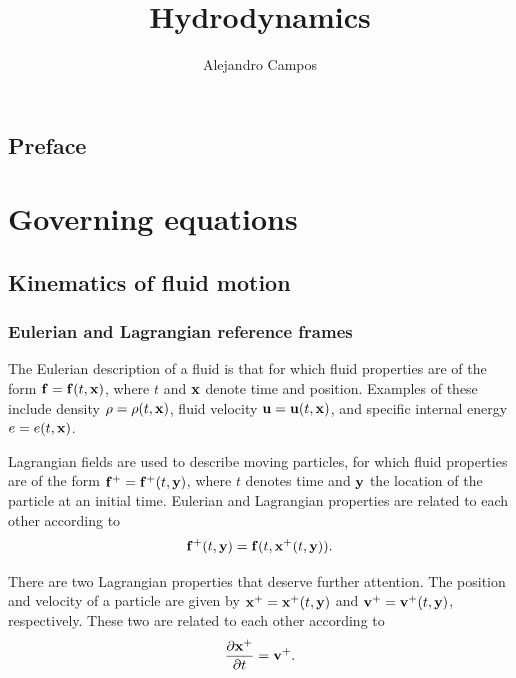 \documentclass[oneside,a4paper,11pt]{report}
\title{Hydrodynamics}
\author{Alejandro Campos}
\begin{document}
\maketitle
\tableofcontents

\chapter*{Preface}

\part{Governing equations}

\chapter{Kinematics of fluid motion}

\section{Eulerian and Lagrangian reference frames}
The Eulerian description of a fluid is that for which fluid properties are of the form $\mathbf{f} = \mathbf{f}(t,\mathbf{x})$, where $t$ and $\mathbf{x}$ denote time and position. Examples of these include density $\rho = \rho(t,\mathbf{x})$, fluid velocity $\mathbf{u} = \mathbf{u}(t,\mathbf{x})$, and specific internal energy $e = e(t, \mathbf{x})$.

Lagrangian fields are used to describe moving particles, for which fluid properties are of the form $\mathbf{f}^+ = \mathbf{f}^+(t,\mathbf{y})$, where $t$ denotes time and $\mathbf{y}$ the location of the particle at an initial time. Eulerian and Lagrangian properties are related to each other according to 
\begin{equation}
\mathbf{f}^+(t,\mathbf{y})=\mathbf{f}(t,\mathbf{x}^+(t,\mathbf{y})).
\end{equation}

There are two Lagrangian properties that deserve further attention. The position and velocity of a particle are given by $\mathbf{x}^+ = \mathbf{x}^+(t,\mathbf{y})$ and $\mathbf{v}^+ = \mathbf{v}^+(t,\mathbf{y})$, respectively. These two are related to each other according to 
\begin{equation}
\frac{\partial \mathbf{x}^+}{\partial t} = \mathbf{v}^+.
\end{equation}
\end{document}
